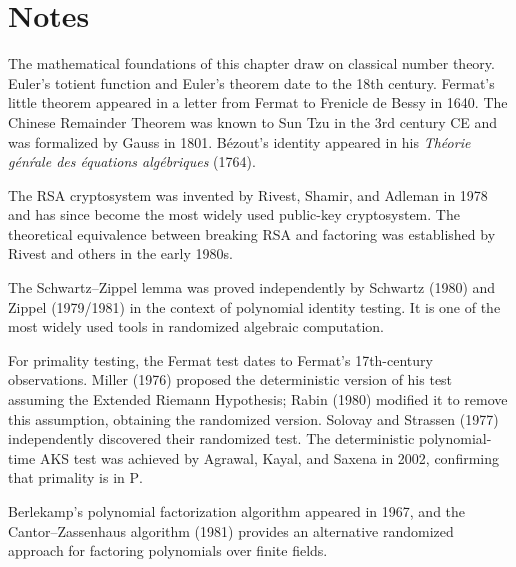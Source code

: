 \documentclass[twoside,12pt]{book}
\theoremstyle{plain}
\theoremstyle{definition}
\theoremstyle{remark}
\begin{document}
\section*{Notes}
\label{sec:notes-14}

The mathematical foundations of this chapter draw on classical number theory. Euler's totient function and Euler's theorem date to the 18th century. Fermat's little theorem appeared in a letter from Fermat to Frenicle de Bessy in 1640. The Chinese Remainder Theorem was known to Sun Tzu in the 3rd century CE and was formalized by Gauss in 1801. B\'ezout's identity appeared in his \emph{Th\'eorie g\'en\'rale des \'equations alg\'ebriques} (1764).

The RSA cryptosystem was invented by Rivest, Shamir, and Adleman in 1978 and has since become the most widely used public-key cryptosystem. The theoretical equivalence between breaking RSA and factoring was established by Rivest and others in the early 1980s.

The Schwartz--Zippel lemma was proved independently by Schwartz (1980) and Zippel (1979/1981) in the context of polynomial identity testing. It is one of the most widely used tools in randomized algebraic computation.

For primality testing, the Fermat test dates to Fermat's 17th-century observations. Miller (1976) proposed the deterministic version of his test assuming the Extended Riemann Hypothesis; Rabin (1980) modified it to remove this assumption, obtaining the randomized version. Solovay and Strassen (1977) independently discovered their randomized test. The deterministic polynomial-time AKS test was achieved by Agrawal, Kayal, and Saxena in 2002, confirming that primality is in $\text{P}$.

Berlekamp's polynomial factorization algorithm appeared in 1967, and the Cantor--Zassenhaus algorithm (1981) provides an alternative randomized approach for factoring polynomials over finite fields.
\end{document}
